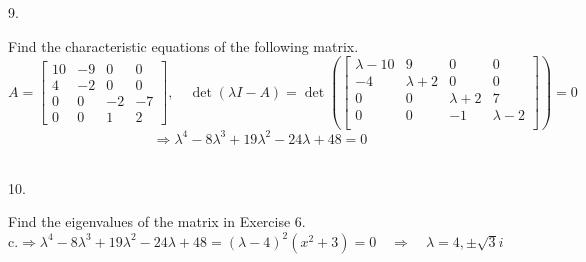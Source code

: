 \documentclass[12pt]{book}
\begin{document}
\begin{CJK}{UTF8}{bsmi}
9. \begin{minipage}[t]{\dimexpr\linewidth}
Find the characteristic equations of the following matrix. \\
$A=\begin{bmatrix}
10 & -9 &  0 &  0 \\
4  & -2 &  0 &  0 \\
0  &  0 & -2 & -7 \\ 
0  &  0 &  1 &  2
\end{bmatrix}
,\quad \det(\lambda I-A) = \det(\begin{bmatrix}
\lambda-10 &         9 &         0 &         0 \\
        -4 & \lambda+2 &         0 &         0 \\
         0 &         0 & \lambda+2 &         7 \\
         0 &         0 &         -1 & \lambda-2 \\
\end{bmatrix}) = 0$
\[
\Rightarrow \lambda^4-8\lambda^3+19\lambda^2-24\lambda+48=0
\]
\end{minipage}\\

10. \begin{minipage}[t]{\dimexpr\linewidth}
Find the eigenvalues of the matrix in Exercise 6. \\
c.$\Rightarrow \lambda^4-8\lambda^3+19\lambda^2-24\lambda+48=(\lambda-4)^2(x^2+3)=0\quad\Rightarrow\quad\lambda=4,\pm \sqrt{3}i$
\end{minipage}\\


\end{CJK}
\end{document}
